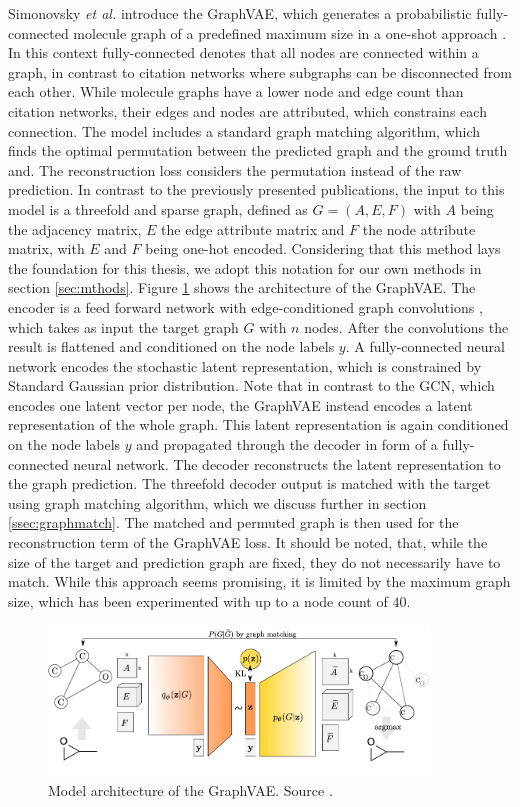 Simonovsky \textit{et al.} introduce the GraphVAE, which generates a probabilistic fully-connected molecule graph of a predefined maximum size
in a one-shot approach \cite{simonovsky_graphvae_2018}. In this context fully-connected denotes that all nodes are connected within a graph, in contrast to citation networks where subgraphs can be disconnected from each other. While molecule graphs have a lower node and edge count than citation networks, their edges and nodes are attributed, which constrains each connection. The model includes a standard graph matching algorithm, which finds the optimal permutation between the predicted graph and the ground truth and. The reconstruction loss considers the permutation instead of the raw prediction. In contrast to the previously presented publications, the input to this model is a threefold and sparse graph, defined as $G=(A, E, F)$ with $A$ being the adjacency matrix, $E$ the edge attribute matrix and $F$ the node attribute matrix, with $E$ and $F$ being one-hot encoded. Considering that this method lays the foundation for this thesis, we adopt this notation for our own methods in section \ref{sec:mthods}. Figure \ref{fig:graphvaefull} shows the architecture of the GraphVAE. The encoder is a feed forward network with edge-conditioned graph convolutions \cite{simonovsky2017dynamic}, which takes as input the target graph $G$ with $n$ nodes. After the convolutions the result is flattened and conditioned on the node labels $y$. A fully-connected neural network encodes the stochastic latent representation, which is constrained by Standard Gaussian prior distribution. Note that in contrast to the GCN, which encodes one latent vector per node, the GraphVAE instead encodes a latent representation of the whole graph. This latent representation is again conditioned on the node labels $y$ and propagated through the decoder in form of a fully-connected neural network. The decoder reconstructs the latent representation to the graph prediction. The threefold decoder output is matched with the target using graph matching algorithm, which we discuss further in section \ref{ssec:graphmatch}. The matched and permuted graph is then used for the reconstruction term of the GraphVAE loss. It should be noted, that, while the size of the target and prediction graph are fixed, they do not necessarily have to match. While this approach seems promising, it is limited by the maximum graph size, which has been experimented with up to a node count of $40$.


\begin{figure}[h]
    \centering
    \includegraphics[width=0.9\textwidth]{data/images/GraphVAEfull.png}
    \caption{Model architecture of the GraphVAE. Source \cite{simonovsky_graphvae_2018}.}
    \label{fig:graphvaefull}
\end{figure}

